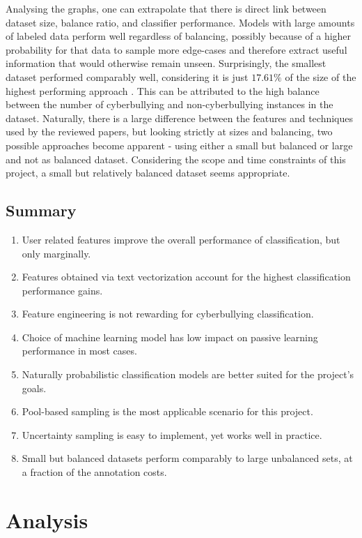 \documentclass[a4paper,12pt]{article}
\begin{document}
Analysing the graphs, one can extrapolate that there is direct link between dataset size, balance ratio, and classifier performance. Models with large amounts of labeled data perform well regardless of balancing, possibly because of a higher probability for that data to sample more edge-cases and therefore extract useful information that would otherwise remain unseen. Surprisingly, the smallest dataset \cite{Zhao2016} performed comparably well, considering it is just $17.61\%$ of the size of the highest performing approach \cite{garadi-highestf/top10features}. This can be attributed to the high balance between the number of cyberbullying and non-cyberbullying instances in the dataset. Naturally, there is a large difference between the features and techniques used by the reviewed papers, but looking strictly at sizes and balancing, two possible approaches become apparent - using either a small but balanced or large and not as balanced dataset. Considering the scope and time constraints of this project, a small but relatively balanced dataset seems appropriate.
\newpage
\subsection{Summary}
\begin{enumerate}
  \item User related features improve the overall performance of classification, but only marginally.
  \item Features obtained via text vectorization account for the highest classification performance gains.
  \item Feature engineering is not rewarding for cyberbullying classification.
  \item Choice of machine learning model has low impact on passive learning performance in most cases.
  \item Naturally probabilistic classification models are better suited for the project's goals.
  \item Pool-based sampling is the most applicable scenario for this project.
  \item Uncertainty sampling is easy to implement, yet works well in practice.
  \item Small but balanced datasets perform comparably to large unbalanced sets, at a fraction of the annotation costs.
\end{enumerate}
\newpage
\section{Analysis}
\end{document}
